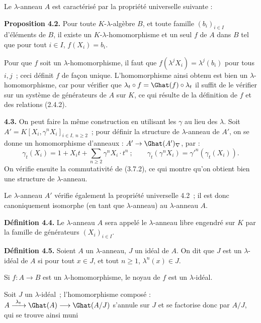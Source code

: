 Le \(\lambda\)-anneau \(A\) est caractérisé par la propriété universelle suivante :

\textbf{Proposition 4.2.} Pour toute \(K\)-\(\lambda\)-algèbre \(B\), et toute famille \((b_i)_{i\in I}\) d'éléments de \(B\), il existe un \(K\)-\(\lambda\)-homomorphisme et un seul \(f\) de \(A\) dans \(B\) tel que pour tout \(i\in I\), \(f(X_i)=b_i\).

Pour que \(f\) soit un \(\lambda\)-homomorphisme, il faut que \(f(\lambda^j X_i)=\lambda^j(b_i)\) pour tous \(i,j\)~; ceci définit \(f\) de façon unique. L'homomorphisme ainsi obtenu est bien un \(\lambda\)-homomorphisme, car pour vérifier que \(\lambda_t\circ f=\Ghat(f)\circ\lambda_t\) il suffit de le vérifier sur un système de générateurs de \(A\) sur \(K\), ce qui résulte de la définition de \(f\) et des relations (2.4.2).

\textbf{4.3.} On peut faire la même construction en utilisant les \(\gamma\) au lieu des \(\lambda\). Soit \(A'=K[X_i,\gamma^n X_i]_{i\in I,\ n\ge2}\)~; pour définir la structure de \(\lambda\)-anneau de \(A'\), on se donne un homomorphisme d'anneaux : \(A'\to\Ghat(A')_\nabla\), par :
\begin{equation}\tag{4.3.1}
  \gamma_t(X_i)=1+X_it+\sum_{n\ge2}\gamma^n X_i\cdot t^n~;
  \qquad
  \gamma_t(\gamma^n X_i)=\gamma'^n(\gamma_t(X_i)).
\end{equation}
On vérifie ensuite la commutativité de (3.7.2), ce qui montre qu'on obtient bien une structure de \(\lambda\)-anneau.

Le \(\lambda\)-anneau \(A'\) vérifie également la propriété universelle 4.2~; il est donc canoniquement isomorphe (en tant que \(\lambda\)-anneau) au \(\lambda\)-anneau \(A\).

\textbf{Définition 4.4.} Le \(\lambda\)-anneau \(A\) sera appelé le \(\lambda\)-anneau libre engendré sur \(K\) par la famille de générateurs \((X_i)_{i\in I}\).

\textbf{Définition 4.5.} Soient \(A\) un \(\lambda\)-anneau, \(J\) un idéal de \(A\). On dit que \(J\) est un \(\lambda\)-idéal de \(A\) si pour tout \(x\in J\), et tout \(n\ge1\), \(\lambda^n(x)\in J\).

Si \(f:A\to B\) est un \(\lambda\)-homomorphisme, le noyau de \(f\) est un \(\lambda\)-idéal.

Soit \(J\) un \(\lambda\)-idéal~; l'homomorphisme composé : \(A\xrightarrow{\ \lambda_t\ }\Ghat(A)\longrightarrow\Ghat(A/J)\) s'annule sur \(J\) et se factorise donc par \(A/J\), qui se trouve ainsi muni 
